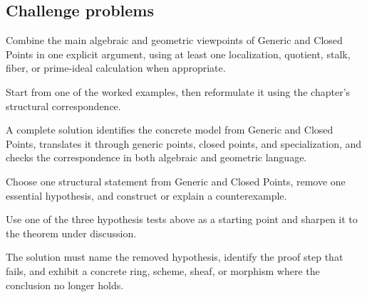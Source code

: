 \subsection*{Challenge problems}

\begin{exercise}\label{exr:vi09-expand-15}
Combine the main algebraic and geometric viewpoints of Generic and Closed Points in one explicit argument, using at least one localization, quotient, stalk, fiber, or prime-ideal calculation when appropriate.
\end{exercise}
\begin{hint}
Start from one of the worked examples, then reformulate it using the chapter's structural correspondence.
\end{hint}
\begin{solution}
A complete solution identifies the concrete model from Generic and Closed Points, translates it through generic points, closed points, and specialization, and checks the correspondence in both algebraic and geometric language.
\end{solution}

\begin{exercise}\label{exr:vi09-expand-16}
Choose one structural statement from Generic and Closed Points, remove one essential hypothesis, and construct or explain a counterexample.
\end{exercise}
\begin{hint}
Use one of the three hypothesis tests above as a starting point and sharpen it to the theorem under discussion.
\end{hint}
\begin{solution}
The solution must name the removed hypothesis, identify the proof step that fails, and exhibit a concrete ring, scheme, sheaf, or morphism where the conclusion no longer holds.
\end{solution}

